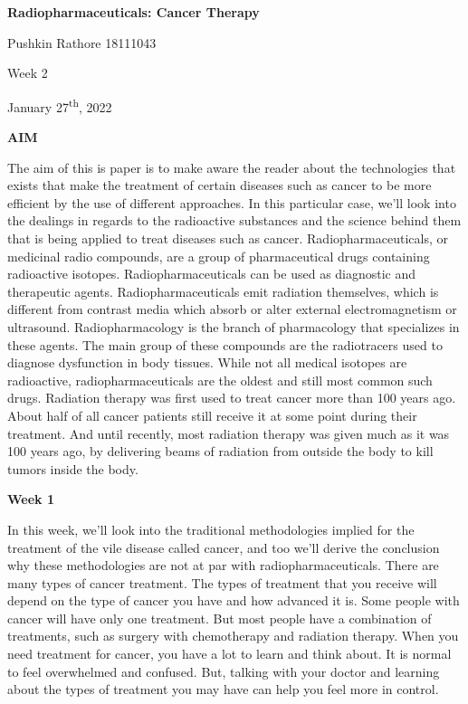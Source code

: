\documentclass[
]{article}
\author{}
\date{}
\begin{document}
\textbf{{Radiopharmaceuticals: Cancer Therapy}}

Pushkin Rathore 18111043

Week 2

January 27\textsuperscript{th}, 2022

\textbf{AIM}

The aim of this is paper is to make aware the reader about the
technologies that exists that make the treatment of certain diseases
such as cancer to be more efficient by the use of different approaches.
In this particular case, we'll look into the dealings in regards to the
radioactive substances and the science behind them that is being applied
to treat diseases such as cancer. Radiopharmaceuticals, or medicinal
radio compounds, are a group of pharmaceutical drugs containing
radioactive isotopes. Radiopharmaceuticals can be used as diagnostic and
therapeutic agents. Radiopharmaceuticals emit radiation themselves,
which is different from contrast media which absorb or alter external
electromagnetism or ultrasound. Radiopharmacology is the branch of
pharmacology that specializes in these agents. The main group of these
compounds are the radiotracers used to diagnose dysfunction in body
tissues. While not all medical isotopes are radioactive,
radiopharmaceuticals are the oldest and still most common such drugs.
Radiation therapy was first used to treat cancer more than 100 years
ago. About half of all cancer patients still receive it at some point
during their treatment. And until recently, most radiation therapy was
given much as it was 100 years ago, by delivering beams of radiation
from outside the body to kill tumors inside the body.

\textbf{Week 1}

In this week, we'll look into the traditional methodologies implied for
the treatment of the vile disease called cancer, and too we'll derive
the conclusion why these methodologies are not at par with
radiopharmaceuticals. There are many types of cancer treatment. The
types of treatment that you receive will depend on the type of cancer
you have and how advanced it is. Some people with cancer will have only
one treatment. But most people have a combination of treatments, such as
surgery with chemotherapy and radiation therapy. When you need treatment
for cancer, you have a lot to learn and think about. It is normal to
feel overwhelmed and confused. But, talking with your doctor and
learning about the types of treatment you may have can help you feel
more in control.
\end{document}
